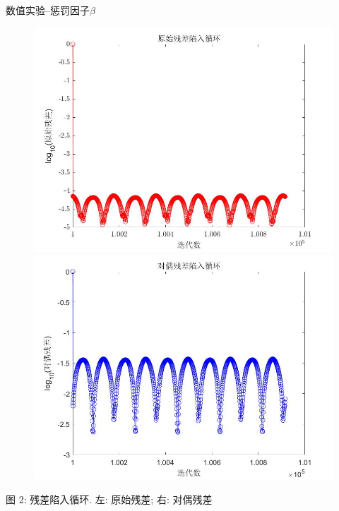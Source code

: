 \documentclass{beamer}
\begin{document}
\begin{frame}{数值实验--惩罚因子$\beta$}
{\begin{figure}[htbp]
	\includegraphics[width=.37\paperwidth]{primalres.jpg}
	\includegraphics[width=.37\paperwidth]{dualres.jpg}
	\label{loop}
\end{figure}
\begin{center}
	\small\textcolor[rgb]{0,0.25,0.604}{图 2: }残差陷入循环. 左: 原始残差; 右: 对偶残差
\end{center}
}
\end{frame}

\end{document}

